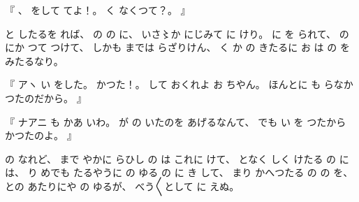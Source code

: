 %
『
、
%
をして
てよ！。
%
く
なくつて？。
』

%
と
したるを
れば、
%
の
の
に、
%
いさ〻か%
にじみて
に
けり。
%
に
を%
られて、
%
の
にか
つて
つけて、
%
しかも
までは
らざりけん、
%
く
か%
の
きたるに
お
は
の
を
みたるなり。

%
『
アヽ
い
をした。
%
かつた！。
%
して%
おくれよ
お
ちやん。
%
ほんとに
も
らなかつたのだから。
』

%
『
ナアニ
も
かあ
いわ。
%
が
の
いたのを
あげるなんて、
%
でも
い
を
つたから
かつたのよ。
』

%
の
なれど、
%
まで
やかに
らひし
の
は
これに
けて、
%
となく
しく
けたる
の
には、
%
り
めでも
たるやうに
の
ゆる
の
に
き%
して、
%
まり
かへつたる
の
の
を、
%
との
あたりにや
の
ゆるが、
%
べう〳〵として
に
えぬ。
